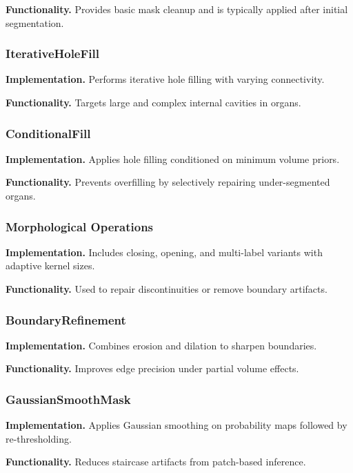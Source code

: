 \documentclass[sigconf]{acmart}
\begin{document}
\textbf{Functionality.}
Provides basic mask cleanup and is typically applied after initial segmentation.

\subsubsection{IterativeHoleFill}

\textbf{Implementation.}
Performs iterative hole filling with varying connectivity.

\textbf{Functionality.}
Targets large and complex internal cavities in organs.

\subsubsection{ConditionalFill}

\textbf{Implementation.}
Applies hole filling conditioned on minimum volume priors.

\textbf{Functionality.}
Prevents overfilling by selectively repairing under-segmented organs.

\subsubsection{Morphological Operations}

\textbf{Implementation.}
Includes closing, opening, and multi-label variants with adaptive kernel sizes.

\textbf{Functionality.}
Used to repair discontinuities or remove boundary artifacts.

\subsubsection{BoundaryRefinement}

\textbf{Implementation.}
Combines erosion and dilation to sharpen boundaries.

\textbf{Functionality.}
Improves edge precision under partial volume effects.

\subsubsection{GaussianSmoothMask}

\textbf{Implementation.}
Applies Gaussian smoothing on probability maps followed by re-thresholding.

\textbf{Functionality.}
Reduces staircase artifacts from patch-based inference.
\end{document}

